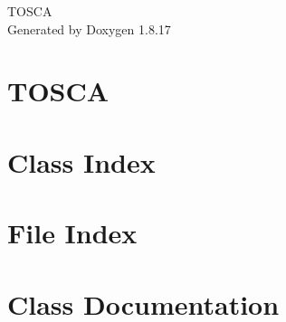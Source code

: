 \let\mypdfximage\pdfximage\def\pdfximage{\immediate\mypdfximage}\documentclass[twoside]{book}
\newcommand{\+}{\discretionary{\mbox{\scriptsize$\hookleftarrow$}}{}{}}
\newcommand{\clearemptydoublepage}{%
  \newpage{\pagestyle{empty}\cleardoublepage}%
}
\begin{document}
\hypersetup{pageanchor=false,
             bookmarksnumbered=true,
             pdfencoding=unicode
            }
\begin{titlepage}
\vspace*{7cm}
\begin{center}%
{\Large T\+O\+S\+CA }\\
\vspace*{1cm}
{\large Generated by Doxygen 1.8.17}\\
\end{center}
\end{titlepage}
\clearemptydoublepage
{}
\tableofcontents
\clearemptydoublepage
{}
\hypersetup{pageanchor=true}

\chapter{T\+O\+S\+CA}
\label{index}\hypertarget{index}{}
\chapter{Class Index}

\chapter{File Index}

\chapter{Class Documentation}




























































\end{document}
